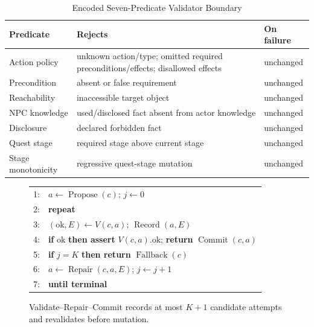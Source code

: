 \begin{table}[!tbp]
\caption{Encoded Seven-Predicate Validator Boundary}
\label{tab:validators}
\centering
\footnotesize
\begin{tabularx}{\columnwidth}{@{}>{\raggedright\arraybackslash}p{}>{\raggedright\arraybackslash}X>{\raggedright\arraybackslash}p{}@{}}
\toprule
\textbf{Predicate} & \textbf{Rejects} & \textbf{On failure} \\
\midrule
Action policy & unknown action/type; omitted required preconditions/effects; disallowed effects & unchanged \\
Precondition & absent or false requirement & unchanged \\
Reachability & inaccessible target object & unchanged \\
NPC knowledge & used/disclosed fact absent from actor knowledge & unchanged \\
Disclosure & declared forbidden fact & unchanged \\
Quest stage & required stage above current stage & unchanged \\
Stage monotonicity & regressive quest-stage mutation & unchanged \\
\bottomrule
\end{tabularx}
\end{table}

\begin{figure}[!tbp]
\centering
\footnotesize
\begin{tabular}{@{}rl@{}}
1: & $a\leftarrow\operatorname{Propose}(c)$; $j\leftarrow0$ \\
2: & \textbf{repeat} \\
3: & \quad $(\mathrm{ok},E)\leftarrow V(c,a)$; $\operatorname{Record}(a,E)$ \\
4: & \quad \textbf{if} $\mathrm{ok}$ \textbf{then assert} $V(c,a).\mathrm{ok}$; \textbf{return} $\operatorname{Commit}(c,a)$ \\
5: & \quad \textbf{if} $j=K$ \textbf{then return} $\operatorname{Fallback}(c)$ \\
6: & \quad $a\leftarrow\operatorname{Repair}(c,a,E)$; $j\leftarrow j+1$ \\
7: & \textbf{until terminal}
\end{tabular}
\caption{Validate--Repair--Commit records at most $K+1$ candidate attempts and revalidates before mutation.}
\label{alg:commit}
\end{figure}

